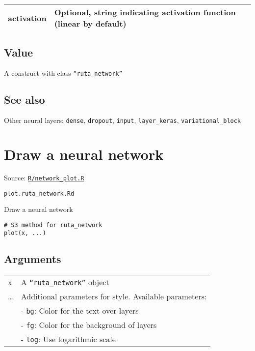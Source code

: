 \begin{longtable}[c]{@{}>{\small}p{3cm}>{\raggedright}p{12.5cm}@{}}
\toprule
activation & Optional, string indicating activation function (linear by
default)\tabularnewline
\bottomrule
\end{longtable}

\hypertarget{value}{\subsection{\texorpdfstring{\protect\hyperlink{value}{}Value}{Value}}\label{value}}

A construct with class \texttt{``ruta\_network''}

\hypertarget{see-also}{\subsection{\texorpdfstring{\protect\hyperlink{see-also}{}See
also}{See also}}\label{see-also}}

Other neural layers: \texttt{dense}, \texttt{dropout}, \texttt{input},
\texttt{layer\_keras}, \texttt{variational\_block}

\section{Draw a neural network}\label{draw-a-neural-network}

Source:
\href{https://github.com/fdavidcl/ruta/blob/master/R/network_plot.R}{\texttt{R/network\_plot.R}}

\texttt{plot.ruta\_network.Rd}

Draw a neural network

\begin{verbatim}
# S3 method for ruta_network
plot(x, ...)
\end{verbatim}

\hypertarget{arguments}{\subsection{\texorpdfstring{\protect\hyperlink{arguments}{}Arguments}{Arguments}}\label{arguments}}

\begin{longtable}[c]{@{}>{\small}p{3cm}>{\raggedright}p{12.5cm}@{}}
\toprule

x
 &

A \texttt{``ruta\_network''} object
\tabularnewline

\ldots{}
 &

Additional parameters for style. Available parameters:
\tabularnewline

 &

- \texttt{bg}: Color for the text over layers
\tabularnewline

 &

- \texttt{fg}: Color for the background of layers
\tabularnewline

 &

- \texttt{log}: Use logarithmic scale
\tabularnewline
\bottomrule
\end{longtable}

